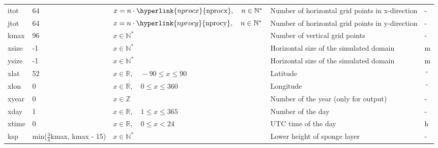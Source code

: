 \documentclass[twoside,11pt,fleqn,a4paper,english,openright]{report}
\begin{document}
\begin{center}
  \tablehead{
  }
  \tabletail{
  }
  \tablelasttail{
        &&&&\\\hline
  }
\begin{supertabular}{|l|p{1.6cm}|p{5cm}|p{6.3cm}|l|}
  itot		& 64		& $x = n \cdot \hyperlink{nprocx}{\text{nprocx}}, \quad n \in \mathbb{N}^*$	& Number of horizontal grid points in x-direction	& -\\
  jtot		& 64		& $x = n \cdot \hyperlink{nprocy}{\text{nprocy}}, \quad n \in \mathbb{N}^*$	& Number of horizontal grid points in y-direction	& -\\
  kmax		& 96		& $x \in \mathbb{N}^*$		& Number of vertical grid points		& -\\
  xsize		& -1		& $x \in \mathbb{N}^*$		& Horizontal size of the simulated domain	& m\\
  ysize		& -1		& $x \in \mathbb{N}^*$		& Horizontal size of the simulated domain	& m\\
  xlat		& 52	& $x \in \mathbb{R}, \quad -90 \leq x \leq 90$			& Latitude					& $\,^{\circ}$\\
  xlon		& 0		& $x \in \mathbb{R}, \quad 0 \leq x \leq 360$			& Longitude					& $\,^{\circ}$\\
  xyear		& 0		& $x \in \mathbb{Z}$		& Number of the year (only for output)				& -\\
  xday		& 1		& $x \in \mathbb{R}, \quad 1 \leq x \leq 365$	& Number of the day				& -\\
  xtime		& 0		& $x \in \mathbb{R}, \quad 0 \leq x < 24$	& UTC time of the day				& h\\
  ksp		& \scriptsize min($\frac{3}{4}$kmax, kmax - 15)	& $x \in \mathbb{N}^*$	& Lower height of sponge layer			& -\\
\end{supertabular}
\end{center}
\end{document}
